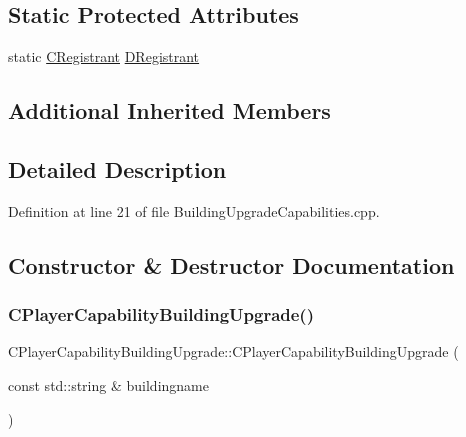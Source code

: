 \subsection*{Static Protected Attributes}
\begin{DoxyCompactItemize}
\item 
static \hyperlink{classCPlayerCapabilityBuildingUpgrade_1_1CRegistrant}{C\+Registrant} \hyperlink{classCPlayerCapabilityBuildingUpgrade_abbc814330c1c8e96abb2f0c512e8abb3}{D\+Registrant}
\end{DoxyCompactItemize}
\subsection*{Additional Inherited Members}


\subsection{Detailed Description}


Definition at line 21 of file Building\+Upgrade\+Capabilities.\+cpp.



\subsection{Constructor \& Destructor Documentation}
\hypertarget{classCPlayerCapabilityBuildingUpgrade_a80ccec4b17a9e43914bec537dcbe1b9e}{}\label{classCPlayerCapabilityBuildingUpgrade_a80ccec4b17a9e43914bec537dcbe1b9e} 
\subsubsection{\texorpdfstring{C\+Player\+Capability\+Building\+Upgrade()}{CPlayerCapabilityBuildingUpgrade()}}
{\footnotesize\ttfamily C\+Player\+Capability\+Building\+Upgrade\+::\+C\+Player\+Capability\+Building\+Upgrade (\begin{DoxyParamCaption}\item[{const std\+::string \&}]{buildingname }\end{DoxyParamCaption})\hspace{0.3cm}{\ttfamily [protected]}}



